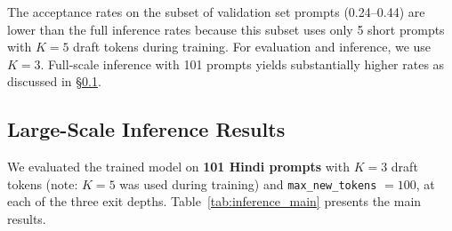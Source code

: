 \documentclass[11pt]{article}
\begin{document}
The acceptance rates on the subset of validation set prompts (0.24--0.44) are lower than the full inference rates because this subset uses only 5 short prompts with $K=5$ draft tokens during training. For evaluation and inference, we use $K=3$. Full-scale inference with 101 prompts yields substantially higher rates as discussed in \S\ref{sec:inference_results}.


\subsection{Large-Scale Inference Results}
\label{sec:inference_results}

We evaluated the trained model on \textbf{101 Hindi prompts} with $K = 3$ draft tokens (note: $K=5$ was used during training) and \texttt{max\_new\_tokens} $= 100$, at each of the three exit depths.  Table~\ref{tab:inference_main} presents the main results.

\begin{table}[t]
\centering
{}
\caption{Inference results on 101 Hindi prompts ($K=3$ for evaluation/inference, $K=5$ for training; \texttt{max\_new\_tokens}$=100$).  Depth 22 achieves the highest acceptance rate and lowest EESD inference time.  Speedup is below 1$\times$ because drafting currently runs the full model (see \S\ref{sec:methodology}).}
\label{tab:inference_main}
\end{table}
\end{document}
